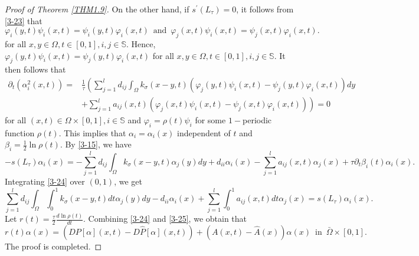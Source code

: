 \documentclass[11pt,reqno]{amsart}
\numberwithin{equation}{section}
\begin{document}
\begin{proof}[Proof of Theorem \ref{THM1.9}]
On the other hand, if $s^{\prime}(L_{\tau}) = 0$, it follows from \eqref{3-23} that
\begin{equation*}
\varphi_{i}(y,t)\psi_{i}(x,t) = \psi_{i}(y,t)\varphi_{i}(x,t)
\enspace \text{and} \enspace
\varphi_{j}(x,t)\psi_{i}(x,t) = \psi_{j}(x,t)\varphi_{i}(x,t).
\end{equation*}
for all $x,y\in\Omega,t\in[0,1],i,j\in \mathbb{S}$. Hence, $\varphi_{j}(y,t)\psi_{i}(x,t) = \psi_{j}(y,t)\varphi_{i}(x,t)$ for all $x,y\in\Omega,t\in[0,1],i,j\in \mathbb{S}$.
It then follows that
\begin{equation*}
\begin{aligned}
\partial_{t}(\alpha_{i}^{2}(x,t)) =& \frac{1}{\tau}
\left(
\sum_{j=1}^{l} d_{ij}\int_{\Omega} k_{\sigma}(x-y,t) \left(\varphi_{j}(y,t)\psi_{i}(x,t) - \psi_{j}(y,t)\varphi_{i}(x,t) \right) dy
\right.\\
& \left. + \sum_{j=1}^{l} a_{ij}(x,t) \left(\varphi_{j}(x,t)\psi_{i}(x,t) -\psi_{j}(x,t)\varphi_{i}(x,t)\right) \right) 
=0
\end{aligned}
\end{equation*}
for all $(x,t)\in\Omega\times[0,1],i\in\mathbb{S}$
and
$\varphi_{i} = \rho(t) \psi_{i}$ for some $1-$periodic function $\rho(t)$.
This implies that $\alpha_{i} = \alpha_{i}(x)$ independent of $t$ and $\beta_{i}= \frac{1}{2} \ln \rho(t)$.
By \eqref{3-15}, we have
\begin{equation}\label{3-24}
-s(L_{\tau})\alpha_{i}(x)
=
-\sum_{j=1}^{l} d_{ij}\int_{\Omega}k_{\sigma}(x-y,t)\alpha_{j}(y)dy + d_{ii}\alpha_{i}(x) - \sum^{l}_{j=1}a_{ij}(x,t)\alpha_{j}(x) + \tau\partial_{t}\beta_{i}(t)\alpha_{i}(x).
\end{equation}
Integrating \eqref{3-24} over $(0,1)$, we get
\begin{equation}\label{3-25}
\sum_{j=1}^{l}d_{ij}\int_{\Omega}\int_{0}^{1} k_{\sigma}(x-y,t)dt \alpha_{j}(y) dy - d_{ii}\alpha_{i}(x) + \sum_{j=1}^{l} \int_{0}^{1} a_{ij}(x,t)dt\alpha_{j}(x)
=
s(L_{\tau})\alpha_{i}(x).
\end{equation}
Let $r(t) = \frac{\tau}{2} \frac{d \ln \rho(t)}{ dt }$. Combining \eqref{3-24} and \eqref{3-25}, we obtain that
\begin{equation*}
r(t)\alpha(x) = \left( DP[\alpha](x,t) - D\hat{P}[\alpha](x,t) \right) +   \left(A(x,t) - \hat{A}(x) \right)\alpha(x)
\enspace  \text{in} \enspace \bar{\Omega}\times[0,1].
\end{equation*}
The proof is completed.
\end{proof}
\end{document}
